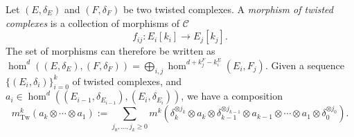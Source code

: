 
 
 
Let $(E, \delta_E)$ and $(F, \delta_F)$ be two twisted complexes. A \emph{morphism of twisted complexes} is a collection of morphisms  of $\mathcal C$
\[f_{ij}:E_i[k_i]\to E_j[k_j].\]
The set of morphisms can therefore be written as $\hom^d((E, \delta_E), (F, \delta_F))=\bigoplus_{i, j}\hom^{d+k^F_j-k^E_i}(E_i, F_j).$
Given a sequence $\{(E_i, \delta_i)\}_{i=0}^k$ of twisted complexes, and $a_i\in\hom^d((E_{i-1}, \delta_{E_{i-1}}), (E_{i}, \delta_{E_{i}}))$, we have a composition 
\[m^k_{\operatorname{Tw}}(a_{k}\otimes \cdots \otimes a_{1} ):=\sum_{j_0, \ldots, j_k\geq 0} m^k(\delta_k^{\otimes j_k}\otimes a_{k}\otimes \delta_{k-1}^{\otimes j_{k-1}}\otimes a_{k-1}\otimes \cdots \otimes a_1\otimes \delta_0^{\otimes j_{0}}).\]

 